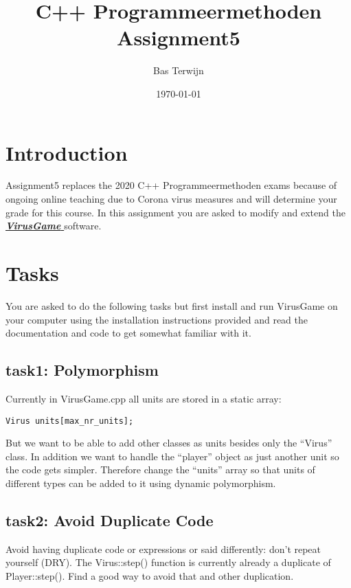 \documentclass[12pt]{article}
\title{C++ Programmeermethoden Assignment5}
\author{Bas Terwijn}
\date{\today}
\newcommand*{\link}[2]{\href{#1}{\color{blue}\textbf{\textit{#2}}}}
\begin{document}
\maketitle

\section{Introduction}
Assignment5 replaces the 2020 C++ Programmeermethoden exams because of
ongoing online teaching due to Corona virus measures and will
determine your grade for this course. In this assignment you are asked
to modify and extend the
\link{https://bitbucket.org/bterwijn/virusgame} { VirusGame }
software.
     
\section{Tasks}
You are asked to do the following tasks but first install and run
VirusGame on your computer using the installation instructions
provided and read the documentation and code to get somewhat
familiar with it.

\subsection{task1: Polymorphism}
Currently in VirusGame.cpp all units are stored in a static array:

\begin{tcolorbox}
\begin{verbatim}
Virus units[max_nr_units];
\end{verbatim}
\end{tcolorbox}

But we want to be able to add other classes as units besides only the
``Virus'' class. In addition we want to handle the ``player'' object as
just another unit so the code gets simpler. Therefore change the
``units'' array so that units of different types can be added to it
using dynamic polymorphism.

\subsection{task2: Avoid Duplicate Code}
Avoid having duplicate code or expressions or said differently: don't
repeat yourself (DRY). The Virus::step() function is currently already
a duplicate of Player::step(). Find a good way to avoid that and other
duplication.
\end{document}
